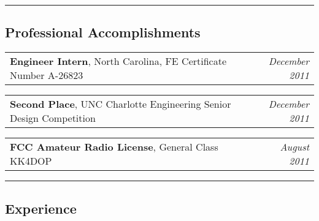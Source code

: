 \documentclass[10pt,letterpaper]{article}
\makeatletter
\newcommand{\headerrow}[2]
{\begin{tabular*}{\linewidth}{l@{\extracolsep{\fill}}r}
	#1 & #2 \\
\end{tabular*}}
\makeatother
\begin{document}
\hrule
\vspace{-0.4em}

\subsection*{Professional Accomplishments}
\headerrow
    {\textbf{Engineer Intern}, North Carolina, FE Certificate Number A-26823}
    {\emph{December 2011}}
\headerrow
    {\textbf{Second Place}, UNC Charlotte Engineering Senior Design Competition}
    {\emph{December 2011}}
\headerrow
    {\textbf{FCC Amateur Radio License}, General Class KK4DOP}
    {\emph{August 2011}}

\hrule
\vspace{-0.4em}
\subsection*{Experience}
\end{document}

